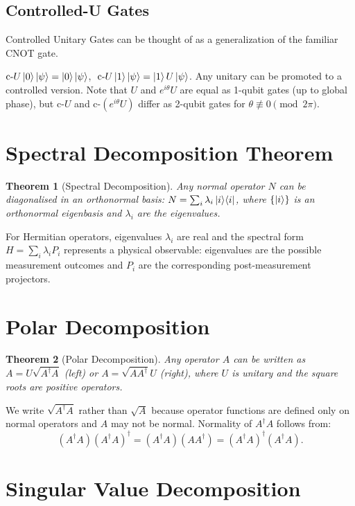 \documentclass[12pt, a4paper, oneside]{report}
\theoremstyle{plain}
\newtheorem{theorem}{Theorem}[chapter]
\theoremstyle{definition}
\theoremstyle{remark}
\newcommand{\oket}[2]{\ket{#1}\!\bra{#2}}
\newcommand{\cU}{\mathrm{c}\text{-}U}
\begin{document}
\subsection{Controlled-U Gates}

Controlled Unitary Gates can be thought of as a generalization of the familiar CNOT gate.

$\cU\ket{0}\ket{\psi} = \ket{0}\ket{\psi}$, $\;\cU\ket{1}\ket{\psi} = \ket{1}U\ket{\psi}$.
Any unitary can be promoted to a controlled version. Note that $U$ and $e^{i\theta}U$ are
equal as 1-qubit gates (up to global phase), but $\cU$ and $\mathrm{c}\text{-}(e^{i\theta}U)$
differ as 2-qubit gates for $\theta \not\equiv 0 \pmod{2\pi}$.


\section{Spectral Decomposition Theorem}

\begin{theorem}[Spectral Decomposition]
	\label{thm:spectral}
	Any normal operator $N$ can be diagonalised in an orthonormal basis:
	$N = \sum_i \lambda_i \oket{i}{i}$,
	where $\{\ket{i}\}$ is an orthonormal eigenbasis and $\lambda_i$ are the eigenvalues.
\end{theorem}

For Hermitian operators, eigenvalues $\lambda_i$ are real and the spectral form
$H = \sum_i \lambda_i P_i$ represents a physical observable: eigenvalues are the possible
measurement outcomes and $P_i$ are the corresponding post-measurement projectors.

\section{Polar Decomposition}

\begin{theorem}[Polar Decomposition]
	Any operator $A$ can be written as $A = U\sqrt{A^\dagger A}$ (left) or $A = \sqrt{AA^\dagger}U$
	(right), where $U$ is unitary and the square roots are positive operators.
\end{theorem}

We write $\sqrt{A^\dagger A}$ rather than $\sqrt{A}$ because operator functions are defined
only on normal operators and $A$ may not be normal. Normality of $A^\dagger A$ follows from:
\[
	(A^\dagger A)(A^\dagger A)^\dagger = (A^\dagger A)(AA^\dagger) = (A^\dagger A)^\dagger(A^\dagger A).
\]

\section{Singular Value Decomposition}
\end{document}
